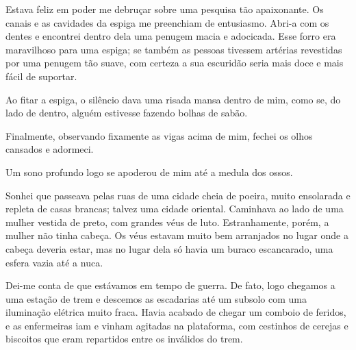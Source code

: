 Estava feliz em poder me debruçar sobre uma pesquisa tão apaixonante. Os
canais e as cavidades da espiga me preenchiam de entusiasmo. Abri-a com os
dentes e encontrei dentro dela uma penugem macia e adocicada. Esse forro era
maravilhoso para uma espiga; se também as pessoas tivessem artérias
revestidas por uma penugem tão suave, com certeza a sua escuridão seria mais
doce e mais fácil de suportar.

Ao fitar a espiga, o silêncio dava uma risada mansa dentro de mim, como se, do
lado de dentro, alguém estivesse fazendo bolhas de sabão.



Finalmente, observando fixamente as vigas acima de mim, fechei os olhos
cansados e adormeci.

Um sono profundo logo se apoderou de mim até a medula dos ossos.

Sonhei que passeava pelas ruas de uma cidade cheia de poeira, muito ensolarada
e repleta de casas brancas; talvez uma cidade oriental. Caminhava ao lado de
uma mulher vestida de preto, com grandes véus de luto. Estranhamente, porém,
a mulher não tinha cabeça. Os véus estavam muito bem arranjados no lugar onde
a cabeça deveria estar, mas no lugar dela só havia um buraco escancarado, uma
esfera vazia até a nuca.


Dei-me conta de que estávamos em tempo de guerra. De fato, logo chegamos a uma
estação de trem e descemos as escadarias até um subsolo com uma iluminação
elétrica muito fraca. Havia acabado de chegar um comboio de feridos, e as
enfermeiras iam e vinham agitadas na plataforma, com cestinhos de cerejas e
biscoitos que eram repartidos entre os inválidos do trem.

